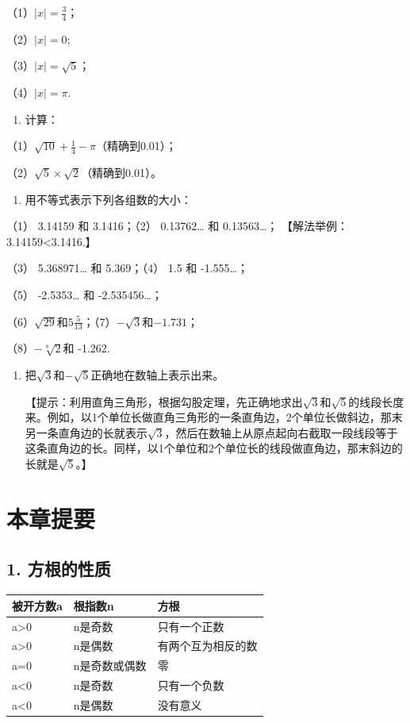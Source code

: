 （1）\(|x| = \frac{3}{4}\)；

（2）\(|x|=0;\)

（3）\(|x|=\sqrt{5}\)；

（4）\(|x| = \pi.\)

\begin{enumerate}[start=3]
\item
  计算：
\end{enumerate}

（1）\(\sqrt{10} + \frac{1}{4} - \pi\)（精确到0.01）；

（2）\(\sqrt{5} \times \sqrt{2}\)（精确到0.01）。

\begin{enumerate}[start=4]
\item
  用不等式表示下列各组数的大小：
\end{enumerate}

（1） 3.14159 和 3.1416；（2） 0.13762\ldots{} 和 0.13563\ldots；
【解法举例：3.14159\textless3.1416.】

（3） 5.368971\ldots{} 和 5.369；（4） 1.5 和 -1.555\ldots；

（5） -2.5353\ldots{} 和 -2.535456\ldots；

（6）\(\sqrt{29}\)和\(5\frac{5}{13}\)；（7）\(-\sqrt{3}\)和\(-1.731\)；

（8）\(-\sqrt[8]{2}\)和 -1.262.

\begin{enumerate}[start=5,label={*\arabic*.}]
\item
  把\(\sqrt{3}\)和\(-\sqrt{5}\)正确地在数轴上表示出来。

【提示：利用直角三角形，根据勾股定理，先正确地求出\(\sqrt{3}\)和\(\sqrt{5}\)的线段长度来。例如，以1个单位长做直角三角形的一条直角边，2个单位长做斜边，那末另一条直角边的长就表示\(\sqrt{3}\)，然后在数轴上从原点起向右截取一段线段等于这条直角边的长。同样，以1个单位和2个单位长的线段做直角边，那末斜边的长就是\(\sqrt{5}\)。】

\end{enumerate}
\section{本章提要}

\subsection{1. 方根的性质}

{\def\LTcaptype{none} %
\begin{longtable}[]{@{}lll@{}}
\toprule\noalign{}
被开方数a & 根指数n & 方根 \\
\midrule\noalign{}
\endhead
\bottomrule\noalign{}
\endlastfoot
a\textgreater0 & n是奇数 & 只有一个正数 \\
a\textgreater0 & n是偶数 & 有两个互为相反的数 \\
a=0 & n是奇数或偶数 & 零 \\
a\textless0 & n是奇数 & 只有一个负数 \\
a\textless0 & n是偶数 & 没有意义 \\
\end{longtable}
}

